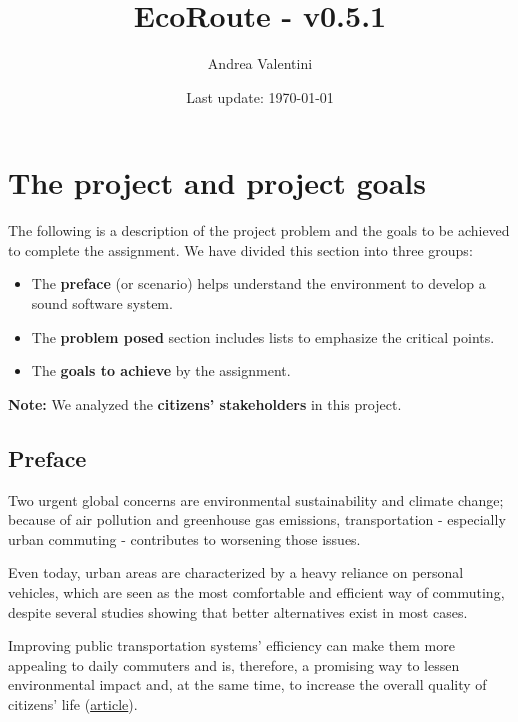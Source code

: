 \documentclass[a4paper]{article}
\newcommand{\highspace}{\vspace{1.2em}\noindent}
\begin{document}
    \author{Andrea Valentini}
    \title{EcoRoute - v0.5.1}
    \date{Last update: \today}
    \maketitle

    \newpage

    \tableofcontents

    \newpage

    \pagestyle{fancy}
    \fancyhead{} %
    \fancyhead[R]{\nouppercase{\leftmark\hfill\rightmark}}

    \section{The project and project goals}

    The following is a description of the project problem and the goals to be achieved to complete the assignment. We have divided this section into three groups:
    \begin{itemize}
        \item The \textbf{preface} (or scenario) helps understand the environment to develop a sound software system.

        \item The \textbf{problem posed} section includes lists to emphasize the critical points.

        \item The \textbf{goals to achieve} by the assignment.
    \end{itemize}
    \textbf{Note:} We analyzed the \textbf{citizens' stakeholders} in this project. 

    \subsection*{Preface}

    Two urgent global concerns are environmental sustainability and climate change; because of air pollution and greenhouse gas emissions, transportation - especially urban commuting - contributes to worsening those issues.

    \highspace
    Even today, urban areas are characterized by a heavy reliance on personal vehicles, which are seen as the most comfortable and efficient way of commuting, despite several studies showing that better alternatives exist in most cases.

    \highspace
    Improving public transportation systems' efficiency can make them more appealing to daily commuters and is, therefore, a promising way to lessen environmental impact and, at the same time, to increase the overall quality of citizens' life (\href{https://journals.plos.org/plosone/article?id=10.1371/journal.pone.0223650}{article}).
\end{document}
